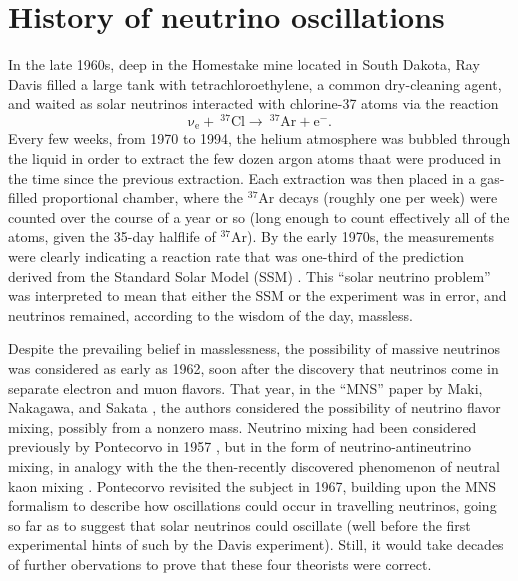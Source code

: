 \documentclass[../thesis.tex]{subfiles}
\begin{document}
\section{History of neutrino oscillations}
\label{sec:history}

In the late 1960s, deep in the Homestake mine located in South Dakota, Ray Davis filled a large tank with tetrachloroethylene, a common dry-cleaning agent, and waited as solar neutrinos interacted with chlorine-37 atoms via the reaction
\begin{equation*}
  \mathrm{\nu_e + \ ^{37}Cl \longrightarrow \ ^{37}Ar + e^-.}  
\end{equation*}
Every few weeks, from 1970 to 1994, the helium atmosphere was bubbled through the liquid in order to extract the few dozen argon atoms thaat were produced in the time since the previous extraction. Each extraction was then placed in a gas-filled proportional chamber, where the $^{37}$Ar decays (roughly one per week) were counted over the course of a year or so (long enough to count effectively all of the atoms, given the 35-day halflife of $^{37}$Ar). By the early 1970s, the measurements were clearly indicating a reaction rate that was one-third of the prediction derived from the Standard Solar Model (SSM) \cite{DAVIS199413}. This ``solar neutrino problem'' was interpreted to mean that either the SSM or the experiment was in error, and neutrinos remained, according to the wisdom of the day, massless.

Despite the prevailing belief in masslessness, the possibility of massive neutrinos was considered as early as 1962, soon after the discovery that neutrinos come in separate electron and muon flavors. That year, in the ``MNS'' paper by Maki, Nakagawa, and Sakata \cite{10.1143/PTP.28.870}, the authors considered the possibility of neutrino flavor mixing, possibly from a nonzero mass. Neutrino mixing had been considered previously by Pontecorvo in 1957 \cite{Pontecorvo:1957cp}, but in the form of neutrino-antineutrino mixing, in analogy with the the then-recently discovered phenomenon of neutral kaon mixing \cite{PhysRev.105.1925.2}. Pontecorvo revisited the subject in 1967, building upon the MNS formalism to describe how oscillations could occur in travelling neutrinos, going so far as to suggest that solar neutrinos could oscillate (well before the first experimental hints of such by the Davis experiment). Still, it would take decades of further obervations to prove that these four theorists were correct.
\end{document}
